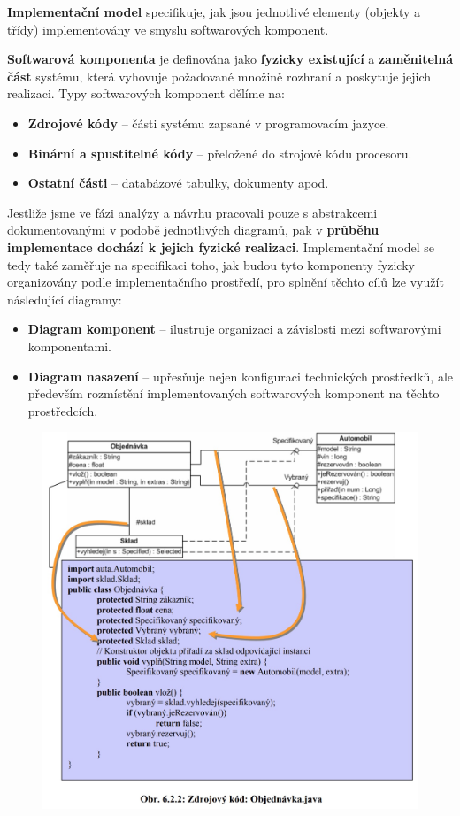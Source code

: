 \textbf{Implementační model }specifikuje, jak jsou jednotlivé elementy (objekty a třídy) implementovány ve smyslu softwarových komponent.

\textbf{Softwarová komponenta} je definována jako \textbf{fyzicky existující} a \textbf{zaměnitelná část} systému, která vyhovuje požadované množině rozhraní a poskytuje jejich realizaci. Typy softwarových komponent dělíme na:

\begin{itemize}
\item \textbf{Zdrojové kódy} -- části systému zapsané v programovacím jazyce.
\item \textbf{Binární a spustitelné kódy} -- přeložené do strojové kódu procesoru.
\item \textbf{Ostatní části} -- databázové tabulky, dokumenty apod.
\end{itemize}

Jestliže jsme ve fázi analýzy a návrhu pracovali pouze s abstrakcemi dokumentovanými v podobě jednotlivých {diagramů}, pak v \textbf{průběhu implementace dochází k jejich fyzické realizaci}. Implementační model se tedy také zaměřuje na specifikaci toho, jak budou tyto {komponenty fyzicky organizovány podle implementačního prostředí}, pro splnění těchto cílů lze využít následující diagramy:
\begin{itemize}
\item \textbf{Diagram komponent} -- ilustruje organizaci a závislosti mezi softwarovými komponentami.
\item \textbf{Diagram nasazení} -- upřesňuje nejen konfiguraci technických prostředků, ale především rozmístění implementovaných softwarových komponent na těchto prostředcích.
\end{itemize}

\begin{figure}[H]
	\centering
	\includegraphics[width=.8\textwidth]{assets/mapovani_uml.jpg}
\end{figure}

